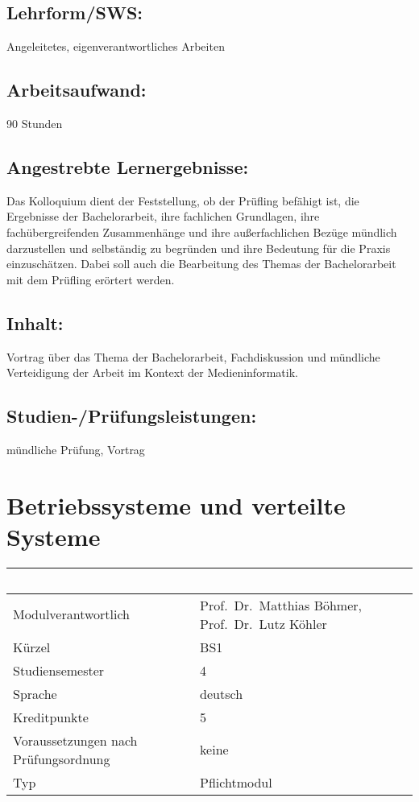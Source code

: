 \section*{Lehrform/SWS:}\label{lehrformsws-4}

Angeleitetes, eigenverantwortliches Arbeiten

\section*{Arbeitsaufwand:}\label{arbeitsaufwand-4}

90 Stunden

\section*{Angestrebte
Lernergebnisse:}\label{angestrebte-lernergebnisse-4}

Das Kolloquium dient der Feststellung, ob der Prüfling befähigt ist, die
Ergebnisse der Bachelorarbeit, ihre fachlichen Grundlagen, ihre
fachübergreifenden Zusammenhänge und ihre außerfachlichen Bezüge
mündlich darzustellen und selbständig zu begründen und ihre Bedeutung
für die Praxis einzuschätzen. Dabei soll auch die Bearbeitung des Themas
der Bachelorarbeit mit dem Prüfling erörtert werden.

\section*{Inhalt:}\label{inhalt-4}

Vortrag über das Thema der Bachelorarbeit, Fachdiskussion und mündliche
Verteidigung der Arbeit im Kontext der Medieninformatik.

\section*{Studien-/Prüfungsleistungen:}\label{studien-pruxfcfungsleistungen-3}

mündliche Prüfung, Vortrag

\chapter{Betriebssysteme und verteilte
Systeme}\label{betriebssysteme-und-verteilte-systeme}

\begin{longtable}[]{@{}ll@{}}
\toprule
~ & ~\tabularnewline
\midrule
\endhead
Modulverantwortlich & Prof.~Dr.~Matthias Böhmer, Prof.~Dr.~Lutz
Köhler\tabularnewline
Kürzel & BS1\tabularnewline
Studiensemester & 4\tabularnewline
Sprache & deutsch\tabularnewline
Kreditpunkte & 5\tabularnewline
Voraussetzungen nach Prüfungsordnung & keine\tabularnewline
Typ & Pflichtmodul\tabularnewline
\bottomrule
\end{longtable}


